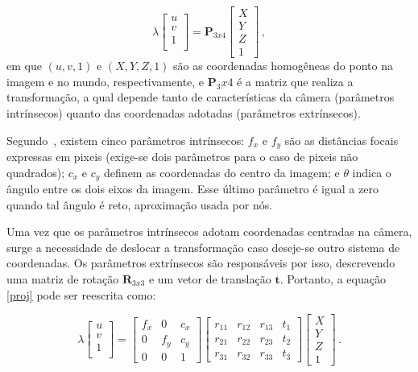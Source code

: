 \documentclass{bmvc2k}
\begin{document}
\begin{equation}
    \label{proj}
    \lambda
    \begin{bmatrix}
    u \\
    v \\
    1 \\
    \end{bmatrix}
    =
    \mathbf{P}_{3x4}
    \begin{bmatrix}
    X \\
    Y \\
    Z \\
    1
    \end{bmatrix}\,,
\end{equation}
em que $(u, v, 1)$ e $(X, Y, Z, 1)$ são as coordenadas homogêneas do ponto na imagem e no mundo, respectivamente, e $\mathbf{P}_3x4$ é a matriz que realiza a transformação, a qual depende tanto de características da câmera (parâmetros intrínsecos) quanto das coordenadas adotadas (parâmetros extrínsecos).

Segundo~\cite{Forsyth:2002:CVM:580035}, existem cinco parâmetros intrínsecos: $f_x$ e $f_y$ são as distâncias focais expressas em pixeis (exige-se dois parâmetros para o caso de pixeis não quadrados); $c_x$ e $c_y$ definem as coordenadas do centro da imagem; e $\theta$ indica o ângulo entre os dois eixos da imagem. Esse último parâmetro é igual a zero quando tal ângulo é reto, aproximação usada por nós.


Uma vez que os parâmetros intrínsecos adotam coordenadas centradas na câmera, surge a necessidade de deslocar a transformação caso deseje-se outro sistema de coordenadas. Os parâmetros extrínsecos são responsáveis por isso, descrevendo uma matriz de rotação $\mathbf{R}_{3x3}$ e um vetor de translação $\bm{t}$. Portanto, a equação \ref{proj} pode ser reescrita como:

\begin{equation}
    \label{world2cam}
    \lambda
    \begin{bmatrix}
    u \\
    v \\
    1 \\
    \end{bmatrix}
    =
    \begin{bmatrix}
    f_x & 0 & c_x \\
    0 & f_y & c_y \\
    0 & 0 & 1
    \end{bmatrix}
    \begin{bmatrix}
    r_{11} & r_{12} & r_{13} & t_1  \\
    r_{21} & r_{22} & r_{23} & t_2  \\
    r_{31} & r_{32} & r_{33} & t_3
    \end{bmatrix}
    \begin{bmatrix}
    X \\
    Y \\
    Z \\
    1
    \end{bmatrix}\,.
\end{equation}
\end{document}
